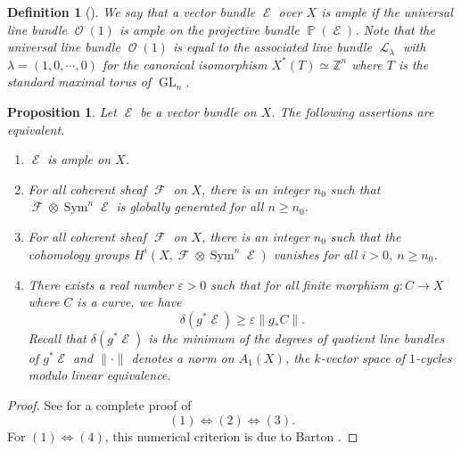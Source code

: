 \documentclass[11pt]{amsart}
\numberwithin{subsection}{section}
\numberwithin{figure}{section}
\numberwithin{table}{section}
\theoremstyle{1}
\newtheorem{proposition}[theorem]{Proposition}
\newtheorem{definition}[theorem]{Definition}
\theoremstyle{2}
\DeclareMathOperator{\GL}{GL}
\DeclareMathOperator{\Sym}{Sym}
\DeclareMathOperator{\Lc}{\mathcal{L}}
\DeclareMathOperator{\Fc}{\mathcal{F}}
\DeclareMathOperator{\E}{\mathcal{E}}
\DeclareMathOperator{\Oc}{\mathcal{O}}
\DeclareMathOperator{\Pb}{\mathbb{P}}
\begin{document}
\begin{definition}[\cite{MR193092}]
We say that a vector bundle $\E$ over $X$ is ample if the universal line bundle $\Oc(1)$ is ample on the projective bundle $\Pb(\E)$. Note that the universal line bundle $\Oc(1)$ is equal to the associated line bundle $\Lc_{\lambda}$ with $\lambda = (1,0,\cdots,0)$ for the canonical isomorphism $X^*(T) \simeq \mathbb{Z}^n$ where $T$ is the standard maximal torus of $\GL_n$.
\end{definition}
\begin{proposition}\label{amp_criterion}
Let $\E$ be a vector bundle on $X$. The following assertions are equivalent.
\begin{enumerate}
\item $\E$ is ample on $X$.
\item For all coherent sheaf $\Fc$ on $X$, there is an integer $n_0$ such that $\Fc \otimes \Sym^{n}\E$ is globally generated for all $n \geq n_0$.
\item For all coherent sheaf $\Fc$ on $X$, there is an integer $n_0$ such that the cohomology groups $H^i(X,\Fc \otimes \Sym^{n}\E)$ vanishes for all $i>0$, $n \geq n_0$.
\item There exists a real number $\varepsilon > 0$ such that for all finite morphism $g : C \rightarrow X$ where $C$ is a curve, we have
\begin{equation*}
\delta(g^*\E) \geq \varepsilon \lVert g_*C \rVert.
\end{equation*}
Recall that $\delta(g^*\E)$ is the minimum of the degrees of quotient line bundles of $g^*\E$ and $\lVert \cdot \rVert$ denotes a norm on $A_1(X)$, the $k$-vector space of $1$-cycles modulo linear equivalence.
\end{enumerate}
\end{proposition}
\begin{proof}
See \cite[Proposition 3.2/3.3]{MR193092} for a complete proof of $$(1) \Leftrightarrow (2) \Leftrightarrow (3).$$For $(1) \Leftrightarrow (4)$, this numerical criterion is due to Barton \cite{MR289525}.
\end{proof}
\end{document}
